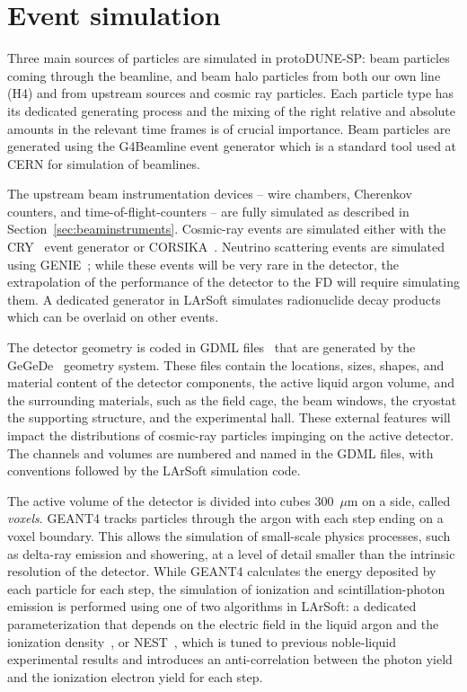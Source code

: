 \section{Event simulation}
\label{sec:larsoftsim}

Three main sources of particles are simulated in protoDUNE-SP: beam particles coming through the beamline, and beam halo particles from both our own line (H4) and from upstream sources and cosmic ray particles. Each particle type has its dedicated generating process and the mixing of the right relative and absolute amounts in the relevant time frames is of crucial importance.
Beam particles are generated using the G4Beamline event generator which is a standard tool used at CERN for simulation of beamlines.

The upstream beam instrumentation devices -- wire chambers, Cherenkov
counters, and time-of-flight-counters -- are fully simulated as described in
Section~\ref{sec:beaminstruments}. Cosmic-ray
events are simulated either with the CRY~\cite{cry, cry2} event generator or
CORSIKA~\cite{Heck:1998vt}.  Neutrino scattering events are simulated
using GENIE~\cite{Andreopoulos:2009rq}; while these %
events will be very
rare in the detector, the extrapolation of the performance of
the \pdsp
detector to the FD will require simulating them. %
A dedicated generator in LArSoft simulates
radionuclide decay products which can be overlaid on other events.

The detector geometry is coded in GDML files~\cite{Agostinelli:2002hh} that are
generated by the GeGeDe~\cite{gegede} 
geometry system.  These files
contain the locations, sizes, shapes, and material content of the
detector components, the active liquid argon volume, and the
surrounding materials, such as the field cage, the beam windows, the
cryostat the supporting structure, and the experimental hall.  These
external features will impact the distributions of cosmic-ray
particles impinging on the active detector.  The channels and volumes
are numbered and named in the GDML files, with conventions followed by
the LArSoft simulation code.

The active volume of the detector is divided into cubes 300~$\mu$m on
a side, called \textit{voxels}.  GEANT4 tracks particles through the argon with
each step ending on a voxel boundary. This allows the simulation of small-scale
physics processes, such as delta-ray emission and showering, at a level
of detail smaller than the intrinsic resolution of the detector.   While GEANT4
calculates the energy deposited by each particle for each step, the
simulation of ionization and scintillation-photon emission 
is performed using one of two algorithms in LArSoft:  a dedicated parameterization that
depends on the electric field in the liquid argon and the ionization
density~\cite{Birks:1964zz}, or  NEST~\cite{Szydagis:2011tk}, which is tuned to
previous noble-liquid experimental results and introduces an
anti-correlation between the photon yield and the ionization electron
yield for each step.  

